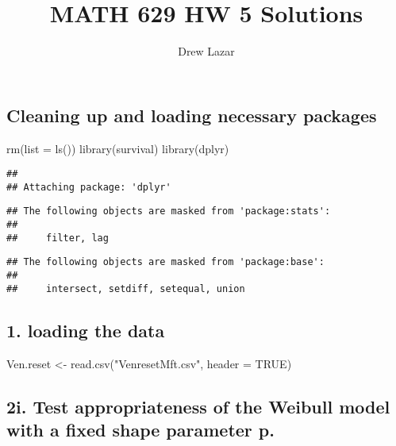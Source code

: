 \documentclass[
]{article}
\title{MATH 629 HW 5 Solutions}
\author{Drew Lazar}
\date{}
\newenvironment{Shaded}{\begin{snugshade}}{\end{snugshade}}
\newcommand{\AttributeTok}[1]{\textcolor[rgb]{0.77,0.63,0.00}{#1}}
\newcommand{\ConstantTok}[1]{\textcolor[rgb]{0.00,0.00,0.00}{#1}}
\newcommand{\FunctionTok}[1]{\textcolor[rgb]{0.00,0.00,0.00}{#1}}
\newcommand{\NormalTok}[1]{#1}
\newcommand{\OtherTok}[1]{\textcolor[rgb]{0.56,0.35,0.01}{#1}}
\newcommand{\StringTok}[1]{\textcolor[rgb]{0.31,0.60,0.02}{#1}}
\begin{document}
\maketitle

\hypertarget{cleaning-up-and-loading-necessary-packages}{%
\subsection{Cleaning up and loading necessary
packages}\label{cleaning-up-and-loading-necessary-packages}}

\begin{Shaded}
\begin{Highlighting}[]
\FunctionTok{rm}\NormalTok{(}\AttributeTok{list =} \FunctionTok{ls}\NormalTok{())}
\FunctionTok{library}\NormalTok{(survival)}
\FunctionTok{library}\NormalTok{(dplyr)}
\end{Highlighting}
\end{Shaded}

\begin{verbatim}
## 
## Attaching package: 'dplyr'
\end{verbatim}

\begin{verbatim}
## The following objects are masked from 'package:stats':
## 
##     filter, lag
\end{verbatim}

\begin{verbatim}
## The following objects are masked from 'package:base':
## 
##     intersect, setdiff, setequal, union
\end{verbatim}

\hypertarget{loading-the-data}{%
\subsection{1. loading the data}\label{loading-the-data}}

\begin{Shaded}
\begin{Highlighting}[]
\NormalTok{Ven.reset }\OtherTok{\textless{}{-}} \FunctionTok{read.csv}\NormalTok{(}\StringTok{"VenresetMft.csv"}\NormalTok{, }\AttributeTok{header =} \ConstantTok{TRUE}\NormalTok{)}
\end{Highlighting}
\end{Shaded}

\hypertarget{i.-test-appropriateness-of-the-weibull-model-with-a-fixed-shape-parameter-p.}{%
\subsection{2i. Test appropriateness of the Weibull model with a fixed
shape parameter
p.}\label{i.-test-appropriateness-of-the-weibull-model-with-a-fixed-shape-parameter-p.}}
\end{document}
